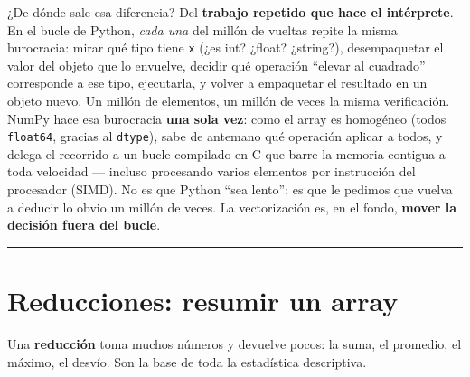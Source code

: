 \documentclass[
  spanish,
  letterpaper,
  DIV=11,
  numbers=noendperiod]{scrreprt}
\begin{document}
¿De dónde sale esa diferencia? Del \textbf{trabajo repetido que hace el
intérprete}. En el bucle de Python, \emph{cada una} del millón de
vueltas repite la misma burocracia: mirar qué tipo tiene \texttt{x} (¿es
int? ¿float? ¿string?), desempaquetar el valor del objeto que lo
envuelve, decidir qué operación ``elevar al cuadrado'' corresponde a ese
tipo, ejecutarla, y volver a empaquetar el resultado en un objeto nuevo.
Un millón de elementos, un millón de veces la misma verificación. NumPy
hace esa burocracia \textbf{una sola vez}: como el array es homogéneo
(todos \texttt{float64}, gracias al \texttt{dtype}), sabe de antemano
qué operación aplicar a todos, y delega el recorrido a un bucle
compilado en C que barre la memoria contigua a toda velocidad ---
incluso procesando varios elementos por instrucción del procesador
(SIMD). No es que Python ``sea lento'': es que le pedimos que vuelva a
deducir lo obvio un millón de veces. La vectorización es, en el fondo,
\textbf{mover la decisión fuera del bucle}.

\begin{center}\rule{0.5\linewidth}{0.5pt}\end{center}

\section{Reducciones: resumir un
array}\label{reducciones-resumir-un-array}

Una \textbf{reducción} toma muchos números y devuelve pocos: la suma, el
promedio, el máximo, el desvío. Son la base de toda la estadística
descriptiva.
\end{document}
